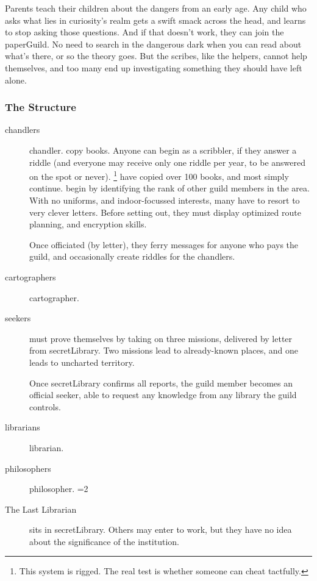 \begin{multicols}{2}
Parents teach their children about the dangers from an early age.
Any child who asks what lies in curiosity's realm gets a swift smack across the head, and learns to stop asking those questions.
And if that doesn't work, they can join the \gls{paperGuild}.
No need to search in the dangerous dark when you can read about what's there, or so the theory goes.
But the scribes, like the helpers, cannot help themselves, and too many end up investigating something they should have left alone.

\subsubsection{The Structure}

\begin{description}
  \item[\Glspl{chandler}]
  \glsdesc{chandler}.
  copy books.
  Anyone can begin as a scribbler, if they answer a riddle (and everyone may receive only one riddle per year, to be answered on the spot or never).%
  \footnote{This system is rigged. The real test is whether someone can cheat tactfully.}
  have copied over 100 books, and most simply continue.
  \label{knowledgeWanderer}%
  begin by identifying the rank of other guild members in the area.
  With no uniforms, and indoor-focussed interests, many have to resort to very clever letters.
  Before setting out, they must display optimized route planning, and encryption skills.

  Once officiated (by letter), they ferry messages for anyone who pays the guild, and occasionally create riddles for the chandlers.
  \item[\Glspl{cartographer}]
  \glsdesc{cartographer}.
  \item[\Glspl{seeker}]
  must prove themselves by taking on three missions, delivered by letter from \gls{secretLibrary}.
  Two missions lead to already-known places, and one leads to uncharted territory.

  Once \gls{secretLibrary} confirms all reports, the guild member becomes an official \gls{seeker}, able to request any knowledge from any library the guild controls.
  \item[\Glspl{librarian}]
  \glsdesc{librarian}.
  \item[\Glspl{philosopher}]
  \glsdesc{philosopher}.
  \ifnum\value{cycle}=2
  \item[The Last Librarian]
  sits in \gls{secretLibrary}.
  Others may enter to work, but they have no idea about the significance of the institution.


\end{description}
\end{multicols}
